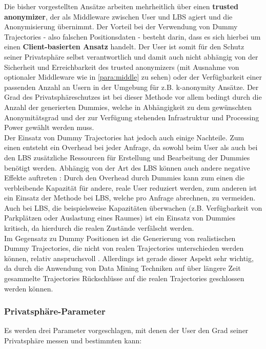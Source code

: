 Die bisher vorgestellten Ansätze arbeiten mehrheitlich über einen \textbf{trusted anonymizer}, der als Middleware zwischen User und LBS agiert und die Anonymisierung übernimmt. Der Vorteil bei der Verwendung von Dummy Trajectories - also falschen Positionsdaten - besteht darin, dass es sich hierbei um einen \textbf{Client-basierten Ansatz} handelt. Der User ist somit für den Schutz seiner Privatsphäre selbst verantwortlich und damit auch nicht abhängig von der Sicherheit und Erreichbarkeit des trusted anonymizers (mit Ausnahme von optionaler Middleware wie in \ref{para:middle} zu sehen) oder der Verfügbarkeit einer passenden Anzahl an Usern in der Umgebung für z.B. k-anonymity Ansätze. Der Grad des Privatsphäreschutzes ist bei dieser Methode vor allem bedingt durch die Anzahl der generierten Dummies, welche in Abhängigkeit zu dem gewünschten Anonymitätsgrad und der zur Verfügung stehenden Infrastruktur und Processing Power gewählt werden muss.\\
Der Einsatz von Dummy Trajectories hat jedoch auch einige Nachteile. Zum einen entsteht ein Overhead bei jeder Anfrage, da sowohl beim User als auch bei den LBS zusätzliche Ressourcen für Erstellung und Bearbeitung der Dummies benötigt werden. Abhängig von der Art des LBS können auch andere negative Effekte auftreten \cite{Beresford2005}: Durch den Overhead durch Dummies kann zum einen die verbleibende Kapazität für andere, reale User reduziert werden, zum anderen ist ein Einsatz der Methode bei LBS, welche pro Anfrage abrechnen, zu vermeiden. Auch bei LBS, die beispielsweise Kapazitäten überwachen (z.B. Verfügbarkeit von Parkplätzen oder Auslastung eines Raumes) ist ein Einsatz von Dummies kritisch, da hierdurch die realen Zustände verfälscht werden.\\
Im Gegensatz zu Dummy Positionen ist die Generierung von realistischen Dummy Trajectories, die nicht von realen Trajectories unterschieden werden können, relativ anspruchsvoll \cite{Beresford2003}. Allerdings ist gerade dieser Aspekt sehr wichtig, da durch die Anwendung von Data Mining Techniken auf über längere Zeit gesammelte Trajectories Rückschlüsse auf die realen Trajectories geschlossen werden können. 

\subsubsection{Privatsphäre-Parameter \cite{You2007, Lei2012}} \label{subsubsection:dgparameter}
Es werden drei Parameter vorgeschlagen, mit denen der User den Grad seiner Privatsphäre messen und bestimmten kann:
